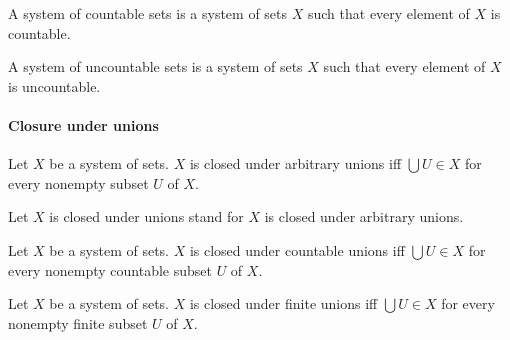\documentclass[../arithmetic.tex]{subfiles}
\begin{document}
  \begin{forthel}
    \begin{definition}
      A system of countable sets is a system of sets $X$ such that every element
      of $X$ is countable.
    \end{definition}
  \end{forthel}

  \begin{forthel}
    \begin{definition}
      A system of uncountable sets is a system of sets $X$ such that every
      element of $X$ is uncountable.
    \end{definition}
  \end{forthel}


  \paragraph{Closure under unions}

  \begin{forthel}
    \begin{definition}
      Let $X$ be a system of sets.
      $X$ is closed under arbitrary unions iff $\bigcup U \in X$ for every
      nonempty subset $U$ of $X$.
    \end{definition}

    Let $X$ is closed under unions stand for $X$ is closed under arbitrary
    unions.
  \end{forthel}

  \begin{forthel}
    \begin{definition}
      Let $X$ be a system of sets.
      $X$ is closed under countable unions iff $\bigcup U \in X$ for every
      nonempty countable subset $U$ of $ X$.
    \end{definition}
  \end{forthel}

  \begin{forthel}
    \begin{definition}
      Let $X$ be a system of sets.
      $X$ is closed under finite unions iff $\bigcup U \in X$ for every nonempty
      finite subset $U$ of $X$.
    \end{definition}
  \end{forthel}
\end{document}

